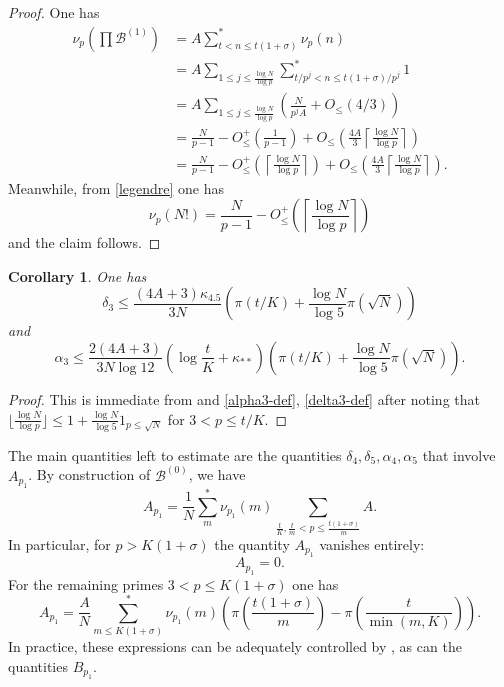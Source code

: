 \documentclass[12pt,a4paper,reqno]{amsart}
\numberwithin{equation}{section}
\theoremstyle{plain}
\newtheorem{corollary}[theorem]{Corollary}
\theoremstyle{definition}
\newcommand\tuple{{\mathcal B}}
\begin{document}
\begin{proof}
One has
  \begin{align*}
    \nu_p(\prod \tuple^{(1)}) &= A \sum_{t < n \leq t(1+\sigma)}^* \nu_p(n) \\
    &= A \sum_{1 \leq j \leq \frac{\log N}{\log p}} \sum_{t/p^j < n \leq t(1+\sigma)/p^j}^* 1 \\
    &= A \sum_{1 \leq j \leq \frac{\log N}{\log p}} \left(\frac{N}{p^j A} + O_{\leq}(4/3)\right) \\
    &= \frac{N}{p-1} - O_{\leq}^+\left(\frac{1}{p-1}\right)
    + O_{\leq}\left(\frac{4A}{3} \left\lceil \frac{\log N}{\log p}  \right\rceil\right) \\
    &= \frac{N}{p-1} 
    - O_{\leq}^+\left(\left\lceil \frac{\log N}{\log p}  \right\rceil\right)
    + O_{\leq}\left(\frac{4A}{3} \left\lceil \frac{\log N}{\log p}  \right\rceil\right).
  \end{align*}
  Meanwhile, from \eqref{legendre} one has
  $$ \nu_p(N!) = \frac{N}{p-1} - O_{\leq}^+\left(\left\lceil \frac{\log N}{\log p}  \right\rceil\right)$$
and the claim follows.  
\end{proof}

\begin{corollary}\label{delta3-alpha3-bound} One has
$$ \delta_3 \leq \frac{(4A+3)\kappa_{4.5}}{3N} \left(\pi(t/K) + \frac{\log N}{\log 5} \pi(\sqrt{N})\right)$$
and
$$ \alpha_3 \leq \frac{2(4A+3)}{3N\log 12} \left(\log \frac{t}{K} + \kappa_{**}\right) \left(\pi(t/K) + \frac{\log N}{\log 5} \pi(\sqrt{N})\right).$$
\end{corollary}

\begin{proof} This is immediate from  and \eqref{alpha3-def}, \eqref{delta3-def} after noting that $\lfloor \frac{\log N}{\log p} \rfloor \leq 1 + \frac{\log N}{\log 5} 1_{p \leq \sqrt{N}}$ for $3 < p \leq t/K$.
\end{proof}

The main quantities left to estimate are the quantities $\delta_4, \delta_5, \alpha_4, \alpha_5$ that involve $A_{p_1}$.  By construction of $\tuple^{(0)}$, we have
$$
A_{p_1} = \frac{1}{N} \sum_m^* \nu_{p_1}(m) \sum_{\frac{t}{K}, \frac{t}{m} < p \leq \frac{t(1+\sigma)}{m}} A.
$$
In particular, for $p > K(1+\sigma)$ the quantity $A_{p_1}$ vanishes entirely:
\begin{equation}\label{ap1-vanish}
  A_{p_1} = 0.
\end{equation}
For the remaining primes $3 < p \leq K(1+\sigma)$ one has
\begin{equation}\label{ap1-small}
A_{p_1} = \frac{A}{N} \sum_{m \leq K(1+\sigma)}^* \nu_{p_1}(m) \left( \pi\left(\frac{t(1+\sigma)}{m}\right) - \pi\left(\frac{t}{\min(m,K)} \right) \right).
\end{equation}
In practice, these expressions can be adequately controlled by , as can the quantities $B_{p_1}$.
\end{document}
